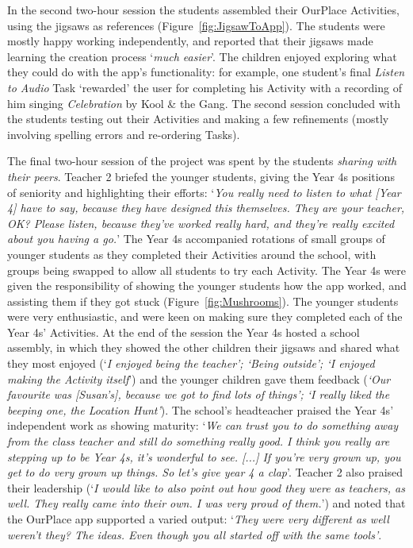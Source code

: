 \documentclass[,hyphens]{sigchi}
\begin{document}
In the second two-hour session the students assembled their OurPlace Activities, using the jigsaws as references (Figure~\ref{fig:JigsawToApp}). The students were mostly happy working independently, and reported that their jigsaws made learning the creation process `\textit{much easier}'. The children enjoyed exploring what they could do with the app's functionality: for example, one student's final \textit{Listen to Audio} Task `rewarded' the user for completing his Activity with a recording of him singing \textit{Celebration} by Kool \& the Gang. The second session concluded with the students testing out their Activities and making a few refinements (mostly involving spelling errors and re-ordering Tasks). 

The final two-hour session of the project was spent by the students \textit{sharing with their peers}. Teacher 2 briefed the younger students, giving the Year 4s positions of seniority and highlighting their efforts: `\textit{You really need to listen to what [Year 4] have to say, because they have designed this themselves. They are your teacher, OK? Please listen, because they've worked really hard, and they're really excited about you having a go.}' The Year 4s accompanied rotations of small groups of younger students as they completed their Activities around the school, with groups being swapped to allow all students to try each Activity. The Year 4s were given the responsibility of showing the younger students how the app worked, and assisting them if they got stuck (Figure~\ref{fig:Mushrooms}). The younger students were very enthusiastic, and were keen on making sure they completed each of the Year 4s' Activities. At the end of the session the Year 4s hosted a school assembly, in which they showed the other children their jigsaws and shared what they most enjoyed (`\textit{I enjoyed being the teacher'; `Being outside'; `I enjoyed making the Activity itself}') and the younger children gave them feedback (\textit{`Our favourite was [Susan's], because we got to find lots of things'; `I really liked the beeping one, the Location Hunt'}). The school's headteacher praised the Year 4s' independent work as showing maturity: `\textit{We can trust you to do something away from the class teacher and still do something really good. I think you really are stepping up to be Year 4s, it's wonderful to see. [...] If you're very grown up, you get to do very grown up things. So let's give year 4 a clap}'. Teacher 2 also praised their leadership (`\textit{I would like to also point out how good they were as teachers, as well. They really came into their own. I was very proud of them.}') and noted that the OurPlace app supported a varied output: `\textit{They were very different as well weren't they? The ideas. Even though you all started off with the same tools'}.
\end{document}
